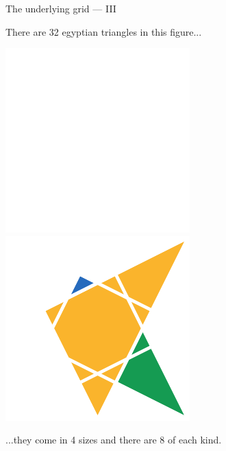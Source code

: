 \documentclass[14pt]{beamer}
\begin{document}

    \begin{frame}{The underlying grid --- III}
        \begin{center}
            There are 32 egyptian triangles in this figure...

            \bigskip \bigskip

            \includegraphics[height=18ex]{figures/figure002b.pdf}\qquad
            \includegraphics[height=18ex]{figures/figure002c.pdf}\\

            \bigskip \bigskip

            ...they come in 4 sizes and there are 8 of each kind.
        \end{center}
    \end{frame}

\end{document}
